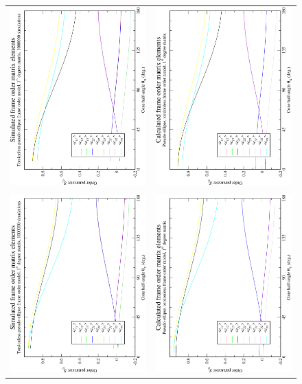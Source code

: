 \begin{figure}
\centering
  \begin{tabular}{@{}cc@{}}
    \includegraphics[width=.35\textwidth,angle=270]{images/frame_order_matrix/Sij_pseudo-ellipse_torsionless_out_of_frame_theta_x_ens1000000.eps} &
    \includegraphics[width=.35\textwidth,angle=270]{images/frame_order_matrix/Sij_pseudo-ellipse_torsionless_out_of_frame_theta_x_calc.eps} \\
    \\[-5pt]
    \includegraphics[width=.35\textwidth,angle=270]{images/frame_order_matrix/Sij_pseudo-ellipse_torsionless_out_of_frame_theta_y_ens1000000.eps} &
    \includegraphics[width=.35\textwidth,angle=270]{images/frame_order_matrix/Sij_pseudo-ellipse_torsionless_out_of_frame_theta_y_calc.eps} \\

\end{tabular}
\end{figure}
